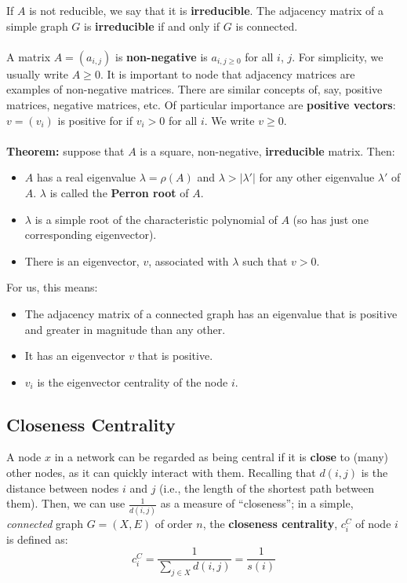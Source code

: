 \documentclass[a4paper,11pt]{article}
\begin{document}
If $A$ is not reducible, we say that it is \textbf{irreducible}.
The adjacency matrix of a simple graph $G$ is \textbf{irreducible} if and only if $G$ is connected.
\\\\
A matrix $A=(a_{i,j})$ is \textbf{non-negative} is $a_{i,j \geq 0}$ for all $i$, $j$.
For simplicity, we usually write $A \geq 0$.
It is important to node that adjacency matrices are examples of non-negative matrices.
There are similar concepts of, say, positive matrices, negative matrices, etc.
Of particular importance are \textbf{positive vectors}:  $v = (v_i)$ is positive for if $v_i > 0$ for all $i$.
We write $v \geq 0$.
\\\\
\textbf{Theorem:} suppose that $A$ is a square, non-negative, \textbf{irreducible} matrix.
Then:
\begin{itemize}
    \item   $A$ has a real eigenvalue $\lambda = \rho(A)$ and $\lambda > |\lambda'|$ for any other eigenvalue $\lambda'$ of $A$.
            $\lambda$ is called the \textbf{Perron root} of $A$.

    \item   $\lambda$ is a simple root of the characteristic polynomial of $A$ (so has just one corresponding eigenvector).

    \item   There is an eigenvector, $v$, associated with $\lambda$ such that $v >0$.
\end{itemize}

For us, this means:
\begin{itemize}
    \item   The adjacency matrix of a connected graph has an eigenvalue that is positive and greater in magnitude than any other.
    \item   It has an eigenvector $v$ that is positive.
    \item   $v_i$ is the eigenvector centrality of the node $i$.
\end{itemize}


\subsection{Closeness Centrality}
A node $x$ in a network can be regarded as being central if it is \textbf{close} to (many) other nodes, as it can quickly interact with them.
Recalling that $d(i,j)$ is the distance between nodes $i$ and $j$ (i.e., the length of the shortest path between them).
Then, we can use $\frac{1}{d(i,j)}$ as a measure of ``closeness'';
in a simple, \textit{connected} graph $G=(X,E)$ of order $n$, the \textbf{closeness centrality}, $c^C_i$ of node $i$ is defined as:
\[
    c_i^C = \frac{1}{\sum_{j \in X} d(i,j)} = \frac{1}{s(i)}
\]
\end{document}

